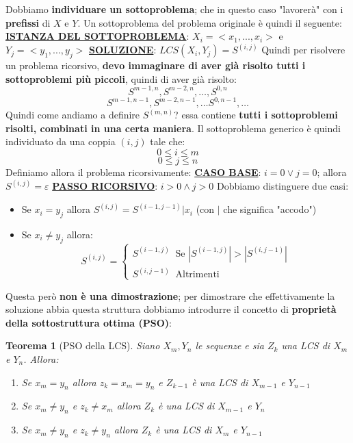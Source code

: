 \documentclass[12pt]{article}
\newtheorem{Teorema}{Teorema}[subsection]
\begin{document}
Dobbiamo \textbf{individuare un sottoproblema}; che in questo caso "lavorerà" con i \textbf{prefissi}
di $X$ e $Y$. Un sottoproblema del problema originale è quindi il seguente: \newline
\textbf{\underline{ISTANZA DEL SOTTOPROBLEMA}}: $X_i = <x_1,...,x_i>$ e $Y_j = <y_1,...,y_j>$ \newline
\textbf{\underline{SOLUZIONE}}: $LCS(X_i, Y_j) = S^{(i,j)}$ \newline
Quindi per risolvere un problema ricorsivo, \textbf{devo immaginare di aver già risolto tutti i sottoproblemi più piccoli}, quindi di aver già risolto:
$$S^{m-1, n}, S^{m-2, n}, \dots, S^{0, n}$$
$$S^{m-1, n-1}, S^{m-2, n-1}, \dots S^{0, n-1}, \dots$$
Quindi come andiamo a definire $S^{(m, n)}$?
essa contiene \textbf{tutti i sottoproblemi risolti, combinati in una certa maniera}. \newline
Il sottoproblema generico è quindi individuato da una coppia $(i,j)$ tale che:
$$0 \leq i \leq m$$
$$0 \leq j \leq n$$
Definiamo allora il problema ricorsivamente: \newline
\textbf{\underline{CASO BASE}}: $i = 0 \vee j = 0$; allora 
$S^{(i,j)} = \varepsilon$ \newline
\textbf{\underline{PASSO RICORSIVO}}: $i > 0 \land j > 0$ \newline
Dobbiamo distinguere due casi:
\begin{itemize}
    \item Se $x_i = y_j$ allora $S^{(i,j)} = S^{(i-1, j-1)}|x_i$ (con $|$ che significa "accodo")
    \item Se $x_i \neq y_j$ allora:
    $$S^{(i,j)} = \begin{cases}
        S^{(i-1, j)} \; \; \textrm{Se } |S^{(i-1, j)}| > |S^{(i, j-1)}| \\
        S^{(i, j-1)} \; \; \textrm{Altrimenti}
    \end{cases}$$
\end{itemize}
Questa però \textbf{non è una dimostrazione}; per dimostrare che effettivamente la soluzione abbia questa struttura dobbiamo introdurre il
concetto di \textbf{proprietà della sottostruttura ottima (PSO)}:
\begin{Teorema}[PSO della LCS]
    Siano $X_m, Y_n$ le sequenze e sia $Z_k$ una LCS di $X_m$ e $Y_n$. Allora:
    \begin{enumerate}
        \item Se $x_m = y_n$ allora $z_k = x_m = y_n$ e $Z_{k-1}$ è una LCS di $X_{m-1}$ e $Y_{n-1}$
        \item Se $x_m \neq y_n$ e $z_k \neq x_m$ allora $Z_k$ è una LCS di $X_{m-1}$ e $Y_n$
        \item Se $x_m \neq y_n$ e $z_k \neq y_n$ allora $Z_k$ è una LCS di $X_m$ e $Y_{n-1}$
    \end{enumerate}
\end{Teorema}
\end{document}
